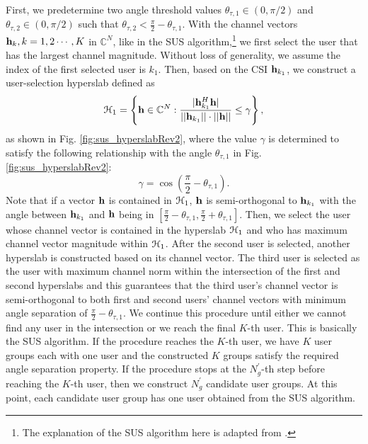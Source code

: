 \documentclass[11pt, draft, onecolumn ]{IEEEtran}
\begin{document}
First, we predetermine two angle threshold values $\theta_{\tau,1} \in (0,\pi/2)$ and $\theta_{\tau,2}\in (0,\pi/2)$ such that $\theta_{\tau,2} <  \frac{\pi}{2}- \theta_{\tau,1}$.
With the channel vectors ${\bf h}_k, k=1,2\cdots,K$ in ${\mathbb{C}}^N$, like in the SUS algorithm,\footnote{The explanation of the SUS algorithm here is adapted from \cite{Yoo&Goldsmith,LeeSung18COM}.}  we  first
select the user that has the largest channel magnitude. Without loss of generality, we assume the index of the first selected user is  $k_1$. Then, based on the CSI
${\bf h}_{k_1}$, we construct a user-selection
hyperslab defined as
\begin{equation}
{\cal H}_{1} = \left\{ {\bf h} \in {\mathbb{C}}^N:
\frac{|{\bf h}_{k_1}^H
{\bf h}|}{||{\bf h}_{k_1}||\cdot||{\bf h}||} \le \gamma  \right\},
\end{equation}
as shown in Fig. \ref{fig:sus_hyperslabRev2}, where the value $\gamma$ is determined to satisfy the following relationship with  the angle $\theta_{\tau,1}$ in Fig.
\ref{fig:sus_hyperslabRev2}:
\[
\gamma = \cos \left(\frac{\pi}{2}-\theta_{\tau,1}\right).
\]
Note that if a vector ${\bf h}$ is
contained in ${\cal H}_{1}$, ${\bf h}$ is semi-orthogonal to
${\bf h}_{k_1}$ with the angle between ${\bf h}_{k_1}$ and ${\bf h}$ being in $[\frac{\pi}{2}-\theta_{\tau,1}, \frac{\pi}{2}+\theta_{\tau,1}]$.
Then, we select the user whose
channel vector is contained in the hyperslab ${\cal H}_{1}$ and who
has maximum channel vector magnitude within ${\cal H}_{1}$. After the
second user is selected, another hyperslab is constructed based on its channel vector. The third user is selected as the user with maximum channel norm within the intersection of the first and second hyperslabs and this guarantees that the third user's channel vector is semi-orthogonal to both first  and second users'
channel vectors with minimum angle separation of $\frac{\pi}{2}-\theta_{\tau,1}$. We continue this procedure until either we cannot find any user in the intersection or we reach the final $K$-th user.   This is basically the SUS algorithm. If the procedure  reaches the $K$-th user, we have $K$ user groups each with one user and the constructed $K$ groups satisfy the required angle separation property. If the procedure stops at the $N^\prime_g$-th step before reaching the $K$-th user, then we construct $N^\prime_g$ candidate user groups. At this point, each candidate user group has one user obtained from the SUS algorithm.
\end{document}
